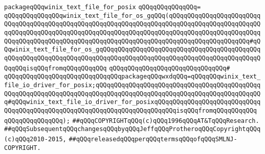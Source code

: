 \newline
\verb|packageqQQqwinix_text_file_for_posix|\newline
\verb|qQQqqQQqqQQqqQQq=|\newline
\verb|qQQqqQQqqQQqqQQqwinix_text_file_for_os_gqQQq(qQQqqQQqqQQqqQQqqQQqqQQqqQQqqQQqqQQqqQQqqQQqqQQqqQQqqQQqqQQqqQQqqQQqqQQqqQQqqQQqqQQqqQQqqQQqqQQqqQQqqQQqqQQqqQQqqQQqqQQqqQQqqQQqqQQqqQQqqQQqqQQqqQQqqQQqqQQqqQQqqQQqqQQqqQQqqQQqqQQqqQQqqQQqqQQqqQQqqQQqqQQqqQQqqQQqqQQqqQQqqQQqqQQqqQQq#qQQqwinix_text_file_for_os_gqQQqqQQqqQQqqQQqqQQqqQQqqQQqqQQqqQQqqQQqqQQqqQQqqQQqqQQqqQQqqQQqqQQqqQQqqQQqqQQqqQQqqQQqqQQqqQQqqQQqqQQqqQQqqQQqqQQqqQQqisqQQqfromqQQqqQQqqQQq|\newline
\verb|qQQqqQQqqQQqqQQqqQQqqQQqqQQqqQQq#|\newline
\verb|qQQqqQQqqQQqqQQqqQQqqQQqqQQqqQQqpackageqQQqwxdqQQq=qQQqqQQqwinix_text_file_io_driver_for_posix;qQQqqQQqqQQqqQQqqQQqqQQqqQQqqQQqqQQqqQQqqQQqqQQqqQQqqQQqqQQqqQQqqQQqqQQqqQQqqQQqqQQqqQQqqQQqqQQqqQQqqQQqqQQqqQQqqQQq#qQQqwinix_text_file_io_driver_for_posixqQQqqQQqqQQqqQQqqQQqqQQqqQQqqQQqqQQqqQQqqQQqqQQqqQQqqQQqqQQqqQQqqQQqqQQqqQQqisqQQqfromqQQqqQQqqQQq|\newline
\verb|qQQqqQQqqQQqqQQq);|\newline
\newline
\newline
\verb|##qQQqCOPYRIGHTqQQq(c)qQQq1996qQQqAT&TqQQqResearch.|\newline
\verb|##qQQqSubsequentqQQqchangesqQQqbyqQQqJeffqQQqProtheroqQQqCopyrightqQQq(c)qQQq2010-2015,|\newline
\verb|##qQQqreleasedqQQqperqQQqtermsqQQqofqQQqSMLNJ-COPYRIGHT.|\newline

